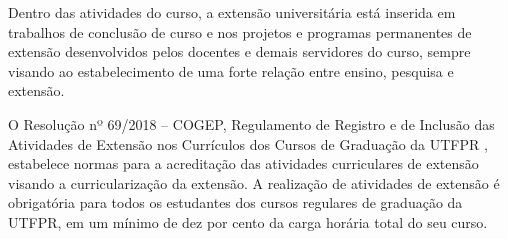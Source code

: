 Dentro das atividades do curso, a extensão universitária está inserida em trabalhos de conclusão de curso e nos projetos e programas permanentes de extensão desenvolvidos pelos docentes e demais servidores do curso, sempre visando ao estabelecimento de uma forte relação entre ensino, pesquisa e extensão.

O Resolução nº 69/2018 – COGEP, Regulamento de Registro e de Inclusão das Atividades de Extensão nos Currículos dos Cursos de Graduação da UTFPR \cite{cogep69}, estabelece normas para a acreditação das atividades curriculares de extensão visando a curricularização da extensão. A realização de atividades de extensão é obrigatória para todos os estudantes dos cursos regulares de graduação da UTFPR, em um mínimo de dez por cento da carga horária total do seu curso. 

